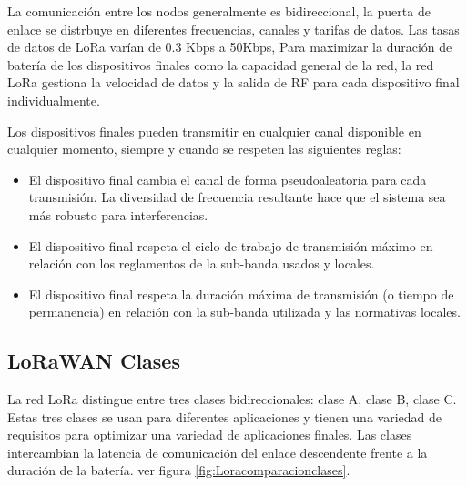 La comunicación entre los nodos generalmente es bidireccional, la puerta de enlace se distrbuye en diferentes frecuencias, canales y tarifas de datos. Las tasas de datos de LoRa varían de 0.3 Kbps a 50Kbps, Para  maximizar la duración de batería de los dispositivos finales como la capacidad general de la red, la red LoRa gestiona la velocidad de datos y la salida de RF para cada dispositivo final individualmente\citep{Specification2015}.



Los dispositivos finales pueden transmitir en cualquier canal disponible en cualquier momento, siempre y cuando se respeten las siguientes reglas:
\begin{itemize}
    \item El dispositivo final cambia el canal de forma pseudoaleatoria para cada  transmisión. La diversidad de frecuencia resultante hace que el sistema sea más robusto para interferencias.
    \item El dispositivo final respeta el ciclo de trabajo de transmisión máximo en relación con los reglamentos de la sub-banda usados y locales.
    \item El dispositivo final respeta la duración máxima de transmisión (o tiempo de permanencia) en relación con la sub-banda utilizada y las normativas locales.
\end{itemize}



\subsection{LoRaWAN Clases}

La red  LoRa distingue entre  tres clases bidireccionales: clase A, clase B, clase C. Estas tres clases se usan para diferentes aplicaciones y tienen una variedad de requisitos para optimizar una variedad de aplicaciones finales. Las clases intercambian la latencia de comunicación del enlace descendente frente a la duración de la batería. ver figura \ref{fig:Loracomparacionclases}.

